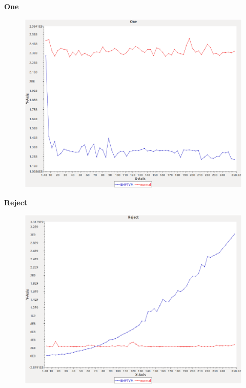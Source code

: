 \noindent\textbf{One}

\begin{figure}[h]
\centering
\includegraphics[width=\textwidth]{../graphs/bag/One}
\end{figure}
\pagebreak

\noindent\textbf{Reject}

\begin{figure}[h]
\centering
\includegraphics[width=\textwidth]{../graphs/bag/Reject}
\end{figure}
\pagebreak

